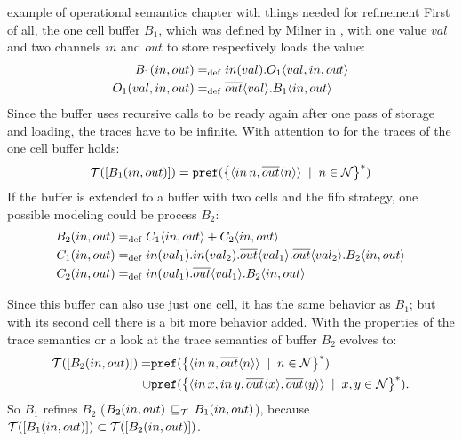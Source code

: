 \begin{old}{example of operational semantics chapter with things needed for refinement}
First of all, the one cell buffer $B_1$, which was defined by Milner in \cite{milner}, with one value $val$ and two channels $in$ and $out$ to store respectively loads the value:
\begin{align*}
	B_1(in,out)&=_{\mathrm{def}}in(val).O_1\langle val,in,out\rangle \\
	O_1(val,in,out)&=_{\mathrm{def}}\overline{out}\langle val\rangle.B_1\langle in,out\rangle
\end{align*}
Since the buffer uses recursive calls to be ready again after one pass of storage and loading, the traces have to be infinite. With attention to  for the traces of the one cell buffer holds:
\[\traces[\procdef{B_1}{in,out}] = \pref{\set[n\in\names]{\seq{\inpa{in}{n},\outa{out}{n}}}^*}\]
If the buffer is extended to a buffer with two cells and the fifo strategy, one possible modeling could be process $B_2$:
\begin{align*}
	B_2(in,out)&=_{\mathrm{def}}{C_1\langle in,out\rangle + C_2\langle in,out\rangle}  \\
	C_1(in,out)&=_{\mathrm{def}}in(val_1).in(val_2).\overline{out}\langle val_1\rangle.\overline{out}\langle val_2\rangle.B_2\langle in,out\rangle	\\
	C_2(in,out)&=_{\mathrm{def}}in(val_1).\overline{out}\langle val_1\rangle.B_2\langle in,out\rangle	
\end{align*}

Since this buffer can also use just one cell, it has the same behavior as $B_1$; but with its second cell there is a bit more behavior added. With the properties of the trace semantics or a look at  the trace semantics of buffer $B_2$ evolves to:
\begin{align*}
	\traces[\procdef{B_2}{in,out}]=&\pref{\set[n\in\names]{\seq{\inpa{in}{n},\outa{out}{n}}}^*} \\
						\cup &\pref{\set[x,y\in\names]{\seq{\inpa{in}{x},\inpa{in}{y},\outa{out}{x},\outa{out}{y}}}^*}.
\end{align*}
So $B_1$ refines $B_2$ ($\procdef{B_2}{in,out}\refi\procdef{B_1}{in,out}$), because $\traces[\procdef{B_1}{in,out}] \subset \traces[\procdef{B_2}{in,out}]$.


\end{old}
